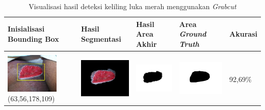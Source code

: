 \begin{table}[H]
	\centering
	\caption{Visualisasi hasil deteksi keliling luka merah menggunakan \emph{Grabcut}}
	\label{tabel_hasil_9}
	\begin{tabular}{|m{1.0in}|m{1.0in}|m{1.0in}|m{1.0in}|m{0.6in}|}
		\hline
		\textbf{Inisialisasi Bounding Box} & \textbf{Hasil Segmentasi} & \textbf{Hasil Area Akhir} & \textbf{Area \emph{Ground Truth}} & \textbf{Akurasi} \\
		\hline
		
		&  &  & \\
		\includegraphics[width=1.0in]{gambar/hasil_segmentasi/luka_merah/image_16_rect.jpg} {\centering\fontsize{10}{10}\selectfont(63,56,178,109)}&
		\includegraphics[width=1.0in]{gambar/hasil_segmentasi/luka_merah/result_16.jpg}&
		\includegraphics[width=1.0in]{gambar/hasil_segmentasi/luka_merah/mask_r_16.jpg}&
		\includegraphics[width=1.0in]{gambar/hasil_segmentasi/luka_merah/16_r.jpg}&
		92,69\% \\
		\hline


\end{tabular}
\end{table}
